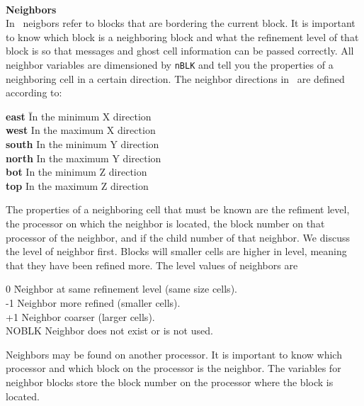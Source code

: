 \ \ \\
{\bf Neighbors} \\
In \BATSRUS\ neigbors refer to blocks that are bordering the current
block.  It is important to know which block is a neighboring block
and what the refinement level of that block is so that messages and
ghost cell information can be passed correctly. All neighbor
variables are dimensioned by {\tt nBLK} and tell you the properties
of a neighboring cell in a certain direction.  The neighbor directions
in \BATSRUS\ are defined according to:
\begin{tabbing}
{\bf east}  \hspace{.25in}\= In the minimum X direction \\
{\bf west}                \> In the maximum X direction \\
{\bf south}               \> In the minimum Y direction \\
{\bf north}               \> In the maximum Y direction \\
{\bf bot}                 \> In the minimum Z direction \\
{\bf top}                 \> In the maximum Z direction
\end{tabbing}

The properties of a neighboring cell that must be known are the
refiment level, the processor on which the neighbor is located,
the block number on that processor of the neighbor, and if the
child number of that neighbor.  We discuss
the level of neighbor first.  Blocks will smaller cells are higher
in level, meaning that they have been refined more.  The level
values of neighbors are
\begin{tabbing}
 0 \hspace{.5in}   \= Neighbor at same refinement level (same size cells). \\
-1                 \> Neighbor more refined (smaller cells). \\
+1                 \> Neighbor coarser (larger cells). \\
NOBLK              \> Neighbor does not exist or is not used.
\end{tabbing}

Neighbors may be found on another processor.  It is important to
know which processor and which block on the processor is the neighbor.
The variables for neighbor blocks store the block number on the
processor where the block is located.

